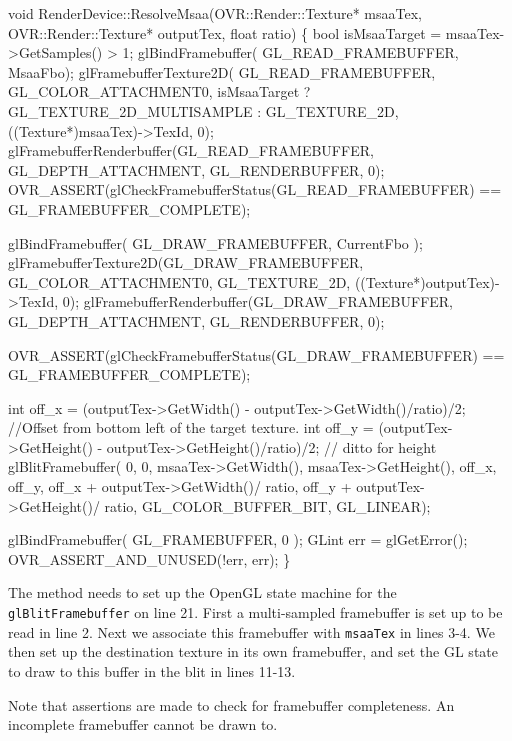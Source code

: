 \documentclass[12pt,a4paper,twoside,openright]{report}
\begin{document}
\begin{smallcode}[commandchars=\\\{\}, numbers=left]
void RenderDevice::ResolveMsaa(OVR::Render::Texture* msaaTex, OVR::Render::Texture* outputTex, float ratio)
\{
    bool isMsaaTarget = msaaTex->GetSamples() > 1;
    glBindFramebuffer( GL_READ_FRAMEBUFFER, MsaaFbo);
    glFramebufferTexture2D( GL_READ_FRAMEBUFFER, GL_COLOR_ATTACHMENT0,
                            isMsaaTarget ? GL_TEXTURE_2D_MULTISAMPLE : GL_TEXTURE_2D,
                            ((Texture*)msaaTex)->TexId, 0);
    glFramebufferRenderbuffer(GL_READ_FRAMEBUFFER, GL_DEPTH_ATTACHMENT, GL_RENDERBUFFER, 0);
    OVR_ASSERT(glCheckFramebufferStatus(GL_READ_FRAMEBUFFER) == GL_FRAMEBUFFER_COMPLETE);

    glBindFramebuffer( GL_DRAW_FRAMEBUFFER, CurrentFbo );
    glFramebufferTexture2D(GL_DRAW_FRAMEBUFFER, GL_COLOR_ATTACHMENT0, GL_TEXTURE_2D, ((Texture*)outputTex)->TexId, 0);
    glFramebufferRenderbuffer(GL_DRAW_FRAMEBUFFER, GL_DEPTH_ATTACHMENT, GL_RENDERBUFFER, 0);

    OVR_ASSERT(glCheckFramebufferStatus(GL_DRAW_FRAMEBUFFER) == GL_FRAMEBUFFER_COMPLETE);

\color{green}    int off_x = (outputTex->GetWidth() - outputTex->GetWidth()/ratio)/2; //Offset from bottom left of the target texture. 
\color{green}    int off_y = (outputTex->GetHeight() - outputTex->GetHeight()/ratio)/2; // ditto for height
\color{green}    glBlitFramebuffer( 0, 0, msaaTex->GetWidth(), msaaTex->GetHeight(), off_x, off_y,
\color{green}                             off_x + outputTex->GetWidth()/ ratio,
\color{green}                             off_y + outputTex->GetHeight()/ ratio,
\color{green}                             GL_COLOR_BUFFER_BIT, GL_LINEAR);

    glBindFramebuffer( GL_FRAMEBUFFER, 0 );  
    GLint err = glGetError();
    OVR_ASSERT_AND_UNUSED(!err, err);
\}
\end{smallcode}

The method needs to set up the OpenGL state machine for the \texttt{glBlitFramebuffer} on line 21. First a multi-sampled framebuffer is set up to be read in line 2. Next we associate this framebuffer with \texttt{msaaTex} in lines 3-4. 
We then set up the destination texture in its own framebuffer, and set the GL state to draw to this buffer in the blit in lines 11-13.

Note that assertions are made to check for framebuffer completeness. An incomplete framebuffer cannot be drawn to.
\end{document}

